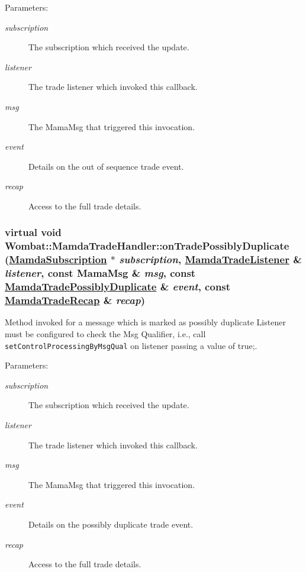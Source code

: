 \begin{Desc}
\item[Parameters:]
\begin{description}
\item[{\em subscription}]The subscription which received the update. \item[{\em listener}]The trade listener which invoked this callback. \item[{\em msg}]The Mama\-Msg that triggered this invocation. \item[{\em event}]Details on the out of sequence trade event. \item[{\em recap}]Access to the full trade details. \end{description}
\end{Desc}
\hypertarget{classWombat_1_1MamdaTradeHandler_7ee70ea10323bc436c6445b0de502b34}{
\subsubsection[onTradePossiblyDuplicate]{\setlength{\rightskip}{0pt plus 5cm}virtual void Wombat::Mamda\-Trade\-Handler::on\-Trade\-Possibly\-Duplicate (\hyperlink{classWombat_1_1MamdaSubscription}{Mamda\-Subscription} $\ast$ {\em subscription}, \hyperlink{classWombat_1_1MamdaTradeListener}{Mamda\-Trade\-Listener} \& {\em listener}, const Mama\-Msg \& {\em msg}, const \hyperlink{classWombat_1_1MamdaTradePossiblyDuplicate}{Mamda\-Trade\-Possibly\-Duplicate} \& {\em event}, const \hyperlink{classWombat_1_1MamdaTradeRecap}{Mamda\-Trade\-Recap} \& {\em recap})}}
\label{classWombat_1_1MamdaTradeHandler_7ee70ea10323bc436c6445b0de502b34}


Method invoked for a message which is marked as possibly duplicate Listener must be configured to check the Msg Qualifier, i.e., call {\tt set\-Control\-Processing\-By\-Msg\-Qual} on listener passing a value of true;. 

\begin{Desc}
\item[Parameters:]
\begin{description}
\item[{\em subscription}]The subscription which received the update. \item[{\em listener}]The trade listener which invoked this callback. \item[{\em msg}]The Mama\-Msg that triggered this invocation. \item[{\em event}]Details on the possibly duplicate trade event. \item[{\em recap}]Access to the full trade details. \end{description}
\end{Desc}
